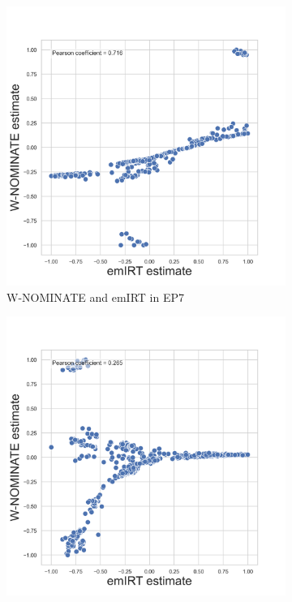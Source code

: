 \documentclass[a4paper,12pt]{report}
\begin{document}
            \begin{figure}[H]
                \centering
                \begin{subfigure}[b]{0.48\textwidth}
                    \centering
                    \includegraphics[width=\textwidth]{Graphs/ScatterWNOMINATE_7}
                    \caption{W-NOMINATE and emIRT in EP7}
                    \label{fig:WNOMINATE_SCATTER_7}
                \end{subfigure}
                \hfill
                \begin{subfigure}[b]{0.48\textwidth}
                    \centering
                    \includegraphics[width=\textwidth]{Graphs/ScatterWNOMINATE_8}

\end{subfigure}
\end{figure}
\end{document}
